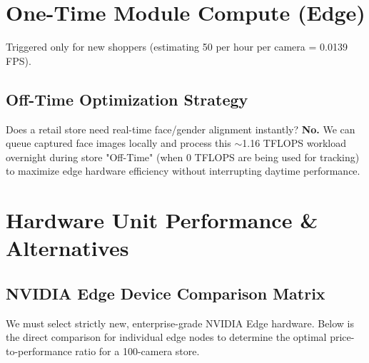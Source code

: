 \documentclass[12pt,a4paper]{article}
\begin{document}
\section{One-Time Module Compute (Edge)}
Triggered only for new shoppers (estimating 50 per hour per camera = 0.0139 FPS).

\begin{table}[h!]
\centering
\small
{}
\caption{One-Time Module Compute}
\end{table}

\subsection*{Off-Time Optimization Strategy}
Does a retail store need real-time face/gender alignment instantly? \textbf{No.} 
We can queue captured face images locally and process this $\sim$1.16 TFLOPS workload overnight during store "Off-Time" (when 0 TFLOPS are being used for tracking) to maximize edge hardware efficiency without interrupting daytime performance.

\section{Hardware Unit Performance \& Alternatives}

\subsection*{NVIDIA Edge Device Comparison Matrix}
We must select strictly new, enterprise-grade NVIDIA Edge hardware. Below is the direct comparison for individual edge nodes to determine the optimal price-to-performance ratio for a 100-camera store.
\end{document}
